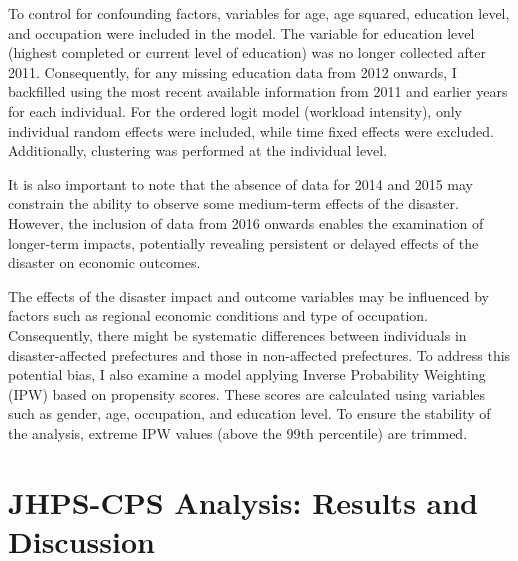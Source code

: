 \documentclass[a4paper,12pt]{article}
\begin{document}



To control for confounding factors, variables for age, age squared, education level, and occupation were included in the model. The variable for education level (highest completed or current level of education) was no longer collected after 2011. Consequently, for any missing education data from 2012 onwards, I backfilled using the most recent available information from 2011 and earlier years for each individual. For the ordered logit model (workload intensity), only individual random effects were included, while time fixed effects were excluded. Additionally, clustering was performed at the individual level.

It is also important to note that the absence of data for 2014 and 2015 may constrain the ability to observe some medium-term effects of the disaster. However, the inclusion of data from 2016 onwards enables the examination of longer-term impacts, potentially revealing persistent or delayed effects of the disaster on economic outcomes.

The effects of the disaster impact and outcome variables may be influenced by factors such as regional economic conditions and type of occupation. Consequently, there might be systematic differences between individuals in disaster-affected prefectures and those in non-affected prefectures. To address this potential bias, I also examine a model applying Inverse Probability Weighting (IPW) based on propensity scores. These scores are calculated using variables such as gender, age, occupation, and education level. To ensure the stability of the analysis, extreme IPW values (above the 99th percentile) are trimmed.


\section{JHPS-CPS Analysis: Results and Discussion}
\end{document}
